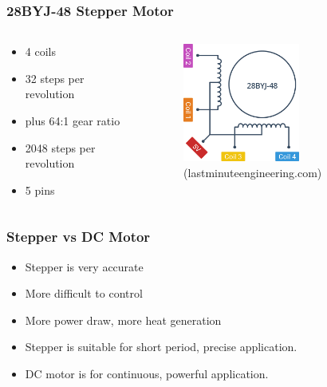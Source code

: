 \documentclass[compress, aspectratio=32]{beamer}
\begin{document}
\begin{frame}
    \frametitle{28BYJ-48 Stepper Motor}
    \begin{columns}
        \begin{column}{0.5\textwidth}
           \begin{itemize}
        \item 4 coils
        \item 32 steps per revolution
        \item plus 64:1 gear ratio
        \item 2048 steps per revolution
        \item 5 pins
    \end{itemize} 
        \end{column}
        \begin{column}[]{0.5\textwidth}
            \begin{figure}
                \centering
                \includegraphics[width=0.6\textwidth]{28BYJ48-Stepper-Motor-Coil-Structure.png}
                \caption*{(lastminuteengineering.com)}
            \end{figure}
        \end{column}
    \end{columns}
    
\end{frame}
\begin{frame}
    \frametitle{Stepper vs DC Motor}
    \begin{itemize}
        \item Stepper is very accurate
        \item More difficult to control
        \item More power draw, more heat generation
        \item Stepper is suitable for short period, precise application.
        \item DC motor is for continuous, powerful application.
    \end{itemize}
\end{frame}
\end{document}

